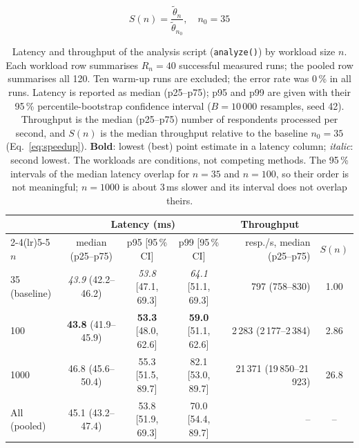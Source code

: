 \documentclass[10pt]{article}
\begin{document}
\begin{equation}
S(n)=\frac{\tilde\theta_{n}}{\tilde\theta_{n_0}},\quad n_0=35
\label{eq:speedup}
\end{equation}
\begin{table}[t]
\centering
\caption{Latency and throughput of the analysis script (\texttt{analyze()}) by workload size $n$.
Each workload row summarises $R_n=40$ successful measured runs; the pooled row summarises all 120.
Ten warm-up runs are excluded; the error rate was 0\,\% in all runs.
Latency is reported as median (p25--p75); p95 and p99 are given with their 95\,\% percentile-bootstrap
confidence interval ($B=10\,000$ resamples, seed 42). Throughput is the median (p25--p75) number of
respondents processed per second, and $S(n)$ is the median throughput relative to the baseline
$n_0=35$ (Eq.~\ref{eq:speedup}). \textbf{Bold}: lowest (best) point estimate in a latency column;
\textit{italic}: second lowest. The workloads are conditions, not competing methods. The 95\,\% intervals of the
median latency overlap for $n=35$ and $n=100$, so their order is not meaningful; $n=1000$ is about
3\,ms slower and its interval does not overlap theirs.}
\label{tab:results}
\small
\begin{tabular}{@{}lcccrc@{}}
\toprule
 & \multicolumn{3}{c}{Latency (ms)} & \multicolumn{1}{c}{Throughput} & \\
\cmidrule(lr){2-4}\cmidrule(lr){5-5}
$n$ & median (p25--p75) & p95 [95\,\% CI] & p99 [95\,\% CI] & resp./s, median (p25--p75) & $S(n)$ \\
\midrule
35 (baseline) & \textit{43.9} (42.2--46.2) & \textit{53.8} [47.1, 69.3] & \textit{64.1} [51.1, 69.3] & 797 (758--830) & 1.00 \\
100 & \textbf{43.8} (41.9--45.9) & \textbf{53.3} [48.0, 62.6] & \textbf{59.0} [51.1, 62.6] & 2\,283 (2\,177--2\,384) & 2.86 \\
1000 & 46.8 (45.6--50.4) & 55.3 [51.5, 89.7] & 82.1 [53.0, 89.7] & 21\,371 (19\,850--21\,923) & 26.8 \\
\midrule
All (pooled) & 45.1 (43.2--47.4) & 53.8 [51.9, 69.3] & 70.0 [54.4, 89.7] & -- & -- \\
\bottomrule
\end{tabular}
\end{table}
\end{document}
